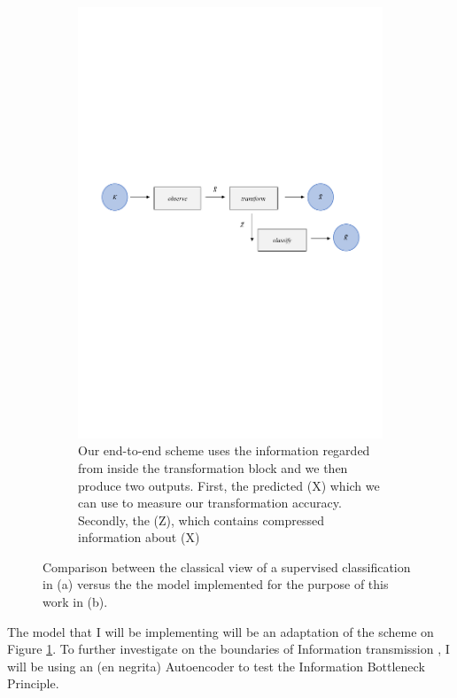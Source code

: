 \documentclass[12pt]{report}
\begin{document}
\begin{figure}[h]
\begin{subfigure}{1\textwidth} 
  \centering
  \includegraphics[width=16.5cm]{Figuras_tfg/Figura1_1_tfg}
  \caption{Our end-to-end scheme uses the information regarded from inside the transformation block and we then produce two outputs. First, the predicted (X) which we can use to measure our transformation accuracy. Secondly, the (Z), which contains compressed information about (X)}
  \label{fig:fig1a} 
\end{subfigure}%
\caption{Comparison between the classical view of a supervised classification in (a) versus the the model implemented for the purpose of this work in (b).}
\label{fig:fig1}
\end{figure}


The model that I will be implementing will be an adaptation of the scheme on Figure \ref{fig:fig1a}. To further investigate on the boundaries of Information transmission , I will be using an (en negrita) Autoencoder to test the Information Bottleneck Principle. \par
\end{document}
